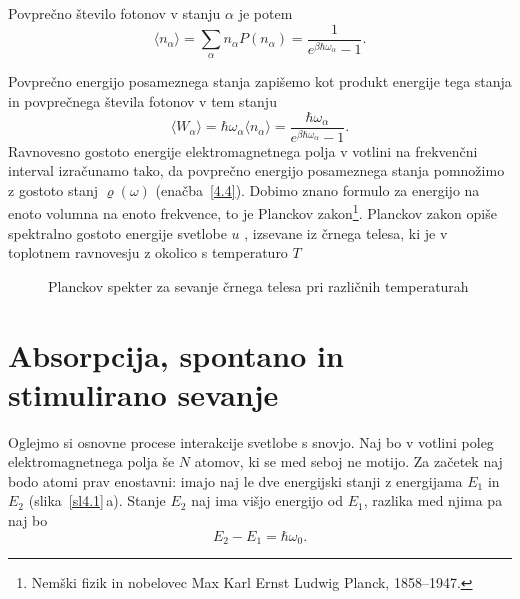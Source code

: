 Povprečno število fotonov 
v stanju $\alpha$ je potem 
\begin{equation}
\langle n_{\alpha}\rangle =\sum_{\alpha}n_{\alpha}P(n_{\alpha})=\frac{1}{e^{\beta\hbar\omega_{\alpha}}-1}.
\label{4.13}
\end{equation}

Povprečno energijo posameznega stanja zapišemo kot produkt energije tega stanja in 
povprečnega števila fotonov v tem stanju
\begin{equation}
\langle W_{\alpha}\rangle = \hbar \omega_\alpha \langle n_\alpha \rangle
= \frac{\hbar \omega_\alpha}{e^{\beta\hbar\omega_{\alpha}}-1}.
\end{equation}
Ravnovesno gostoto energije elektromagnetnega polja v votlini na
frekvenčni interval izračunamo tako, da povprečno energijo posameznega
stanja pomnožimo z gostoto stanj $\varrho (\omega)$ 
(enačba~\ref{4.4}). Dobimo znano formulo za energijo na enoto volumna na enoto frekvence, 
to je Planckov 
zakon\footnote{Nemški fizik in nobelovec Max Karl Ernst Ludwig Planck, 1858--1947.}.
Planckov zakon opiše spektralno gostoto energije svetlobe $u$ 
, izsevane iz 
črnega telesa, ki je v toplotnem ravnovesju z 
okolico s temperaturo $T$

\begin{figure}[h]
\centering
\def\svgwidth{110truemm} 

\caption{Planckov spekter za sevanje črnega telesa pri različnih temperaturah}
\label{fig:Planck}
\end{figure}

\section{Absorpcija, spontano in stimulirano sevanje}
Oglejmo si osnovne procese interakcije svetlobe s snovjo. Naj
bo v votlini poleg elektro\-magnet\-nega polja še $N$ atomov, ki se med
seboj ne motijo. Za začetek naj bodo atomi prav enostavni:
imajo naj le dve energijski stanji z energijama $E_{1}$ in $E_{2}$ (slika~\ref{sl4.1}\,a). 
Stanje $E_2$ naj ima višjo energijo od $E_1$, razlika med njima pa naj bo
\begin{equation}
 E_2 - E_1 = \hbar \omega_0.
\end{equation}

